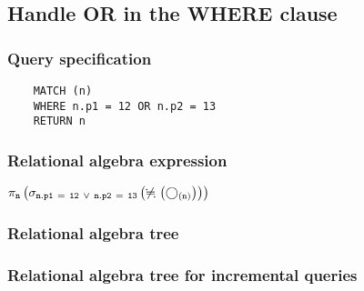 	\subsection{Handle OR in the WHERE clause}

	\subsubsection*{Query specification}

	\begin{lstlisting}
	MATCH (n)
	WHERE n.p1 = 12 OR n.p2 = 13
	RETURN n
	\end{lstlisting}


	\subsubsection*{Relational algebra expression}

	$\projection{\var{n}} \left(\selection{\mathtt{n.p1~=~12~\lor~n.p2~=~13}} \left(\alldifferent{} \left(\getvertices{n}{}\right)\right)\right)$

	\subsubsection*{Relational algebra tree}


	\subsubsection*{Relational algebra tree for incremental queries}

